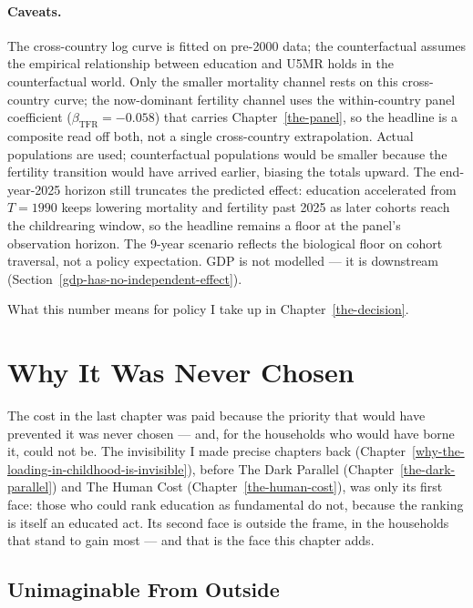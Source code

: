 \documentclass[12pt,letterpaper]{article}
\begin{document}
\paragraph{Caveats.} The cross-country log curve is fitted on
pre-2000 data; the counterfactual assumes the empirical relationship
between education and U5MR holds in the counterfactual world.
Only the smaller mortality channel rests on this cross-country curve;
the now-dominant fertility channel uses the within-country panel
coefficient ($\beta_{\text{TFR}} = -0.058$) that carries
Chapter~\ref{the-panel}, so the headline is a composite read off both,
not a single cross-country extrapolation.
Actual populations are used; counterfactual populations would be
smaller because the fertility transition would have arrived earlier,
biasing the totals upward. The end-year-2025 horizon still truncates the
predicted effect: education accelerated from $T = 1990$ keeps lowering
mortality and fertility past 2025 as later cohorts reach the
childrearing window, so the headline remains a floor at the panel's
observation horizon. The 9-year scenario reflects the biological
floor on cohort traversal, not a policy expectation. GDP is not
modelled --- it is downstream
(Section~\ref{gdp-has-no-independent-effect}).

What this number means for policy I take up in
Chapter~\ref{the-decision}.

\section{Why It Was Never Chosen}\label{why-it-was-never-chosen}

The cost in the last chapter was paid because the priority that
would have prevented it was never chosen --- and, for the households
who would have borne it, could not be. The invisibility I made precise
chapters back (Chapter~\ref{why-the-loading-in-childhood-is-invisible}), before The Dark Parallel
(Chapter~\ref{the-dark-parallel}) and The Human Cost
(Chapter~\ref{the-human-cost}), was only its
first face: those who could rank education as fundamental do not,
because the ranking is itself an educated act. Its second face is
outside the frame, in the households that stand to gain most --- and
that is the face this chapter adds.

\subsection{Unimaginable From Outside}\label{unimaginable-from-outside}
\end{document}
